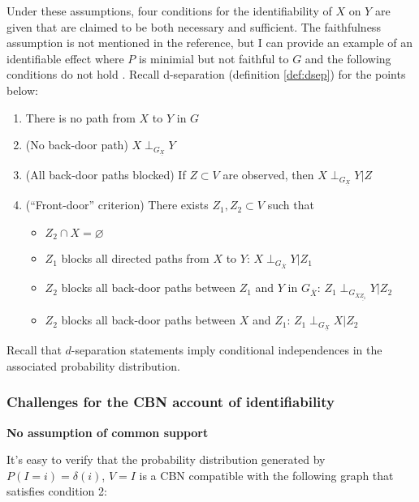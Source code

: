 Under these assumptions, four conditions for the identifiability of $X$ on $Y$ are given that are claimed to be both necessary and sufficient. The faithfulness assumption is not mentioned in the reference, but I can provide an example of an identifiable effect where $P$ is minimial but not faithful to $G$ and the following conditions do not hold \cite{galles_testing_2013}. Recall d-separation (definition \ref{def:dsep}) for the points below:

\begin{enumerate}
    \item There is no path from $X$ to $Y$ in $G$
    \item (No back-door path) $X\perp_{G_{\underline{X}}} Y$
    \item (All back-door paths blocked) If $Z\subset V$ are observed, then $X\perp_{G_{\underline{X}}} Y|Z$
    \item (``Front-door'' criterion) There exists $Z_1, Z_2 \subset V$ such that
    \begin{itemize}
        \item $Z_2\cap X =\varnothing$
        \item $Z_1$ blocks all directed paths from $X$ to $Y$: $X \perp_{G_{\overline{X}}} Y | Z_1$
        \item $Z_2$ blocks all back-door paths between $Z_1$ and $Y$ in $G_{\overline{X}}$: $Z_1 \perp_{G_{{\overline{X}}{\underline{Z_1}}}} Y | Z_2$
        \item $Z_2$ blocks all back-door paths between $X$ and $Z_1$: $Z_1 \perp_{G_{{\underline{X}}}} X | Z_2$
    \end{itemize}
\end{enumerate}

Recall that $d$-separation statements imply conditional independences in the associated probability distribution.

\subsubsection{Challenges for the CBN account of identifiability}

\textbf{No assumption of common support} 

It's easy to verify that the probability distribution generated by $P(I=i)=\delta(i)$, $V=I$ is a CBN compatible with the following graph that satisfies condition 2:

\begin{center}
\end{center}

